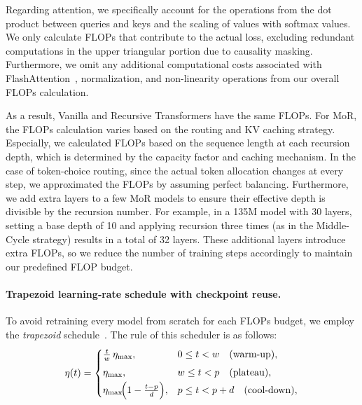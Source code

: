 Regarding attention, we specifically account for the operations from the dot product between queries and keys and the scaling of values with softmax values. We only calculate FLOPs that contribute to the actual loss, excluding redundant computations in the upper triangular portion due to causality masking. Furthermore, we omit any additional computational costs associated with FlashAttention~\citep{dao2022flashattention}, normalization, and non-linearity operations from our overall FLOPs calculation.

As a result, Vanilla and Recursive Transformers have the same FLOPs. For MoR, the FLOPs calculation varies based on the routing and KV caching strategy. Especially, we calculated FLOPs based on the sequence length at each recursion depth, which is determined by the capacity factor and caching mechanism. In the case of token-choice routing, since the actual token allocation changes at every step, we approximated the FLOPs by assuming perfect balancing.
Furthermore, we add extra layers to a few MoR models to ensure their effective depth is divisible by the recursion number. For example, in a 135M model with 30 layers, setting a base depth of 10 and applying recursion three times (as in the Middle-Cycle strategy) results in a total of 32 layers. These additional layers introduce extra FLOPs, so we reduce the number of training steps accordingly to maintain our predefined FLOP budget.



\vspace{-10pt}
\paragraph{Trapezoid learning‑rate schedule with checkpoint reuse.}
To avoid retraining every model from scratch for each FLOPs budget, we employ the \textit{trapezoid} schedule~\citep{xing2018walk}. The rule of this scheduler is as follows:
\begin{equation*}
\eta(t)=
\begin{cases}
\frac{t}{w}\,\eta_{\max}, & 0 \le t < w             \quad\text{(warm‑up)},\\[4pt]
\eta_{\max},                            & w \le t < p             \quad\text{(plateau)},\\[2pt]
\eta_{\max}\!\Bigl(1-\tfrac{t-p}{d}\Bigr), & p\le t < p+d \quad\text{(cool‑down)},
\end{cases}
\end{equation*}

